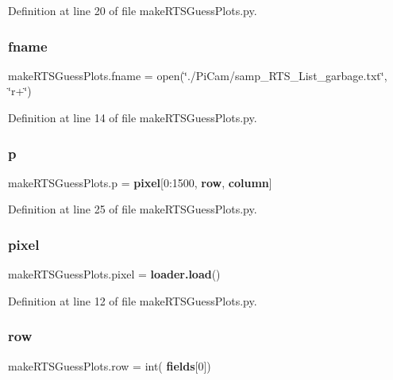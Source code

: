 Definition at line 20 of file make\+R\+T\+S\+Guess\+Plots.\+py.

\mbox{\label{namespacemake_r_t_s_guess_plots_abaa16a9153c4f7d706d33703b75417bc}} 
\subsubsection{fname}
{\footnotesize\ttfamily make\+R\+T\+S\+Guess\+Plots.\+fname = open(\char`\"{}./Pi\+Cam/samp\+\_\+\+R\+T\+S\+\_\+\+List\+\_\+garbage.\+txt\char`\"{}, \char`\"{}r+\char`\"{})}



Definition at line 14 of file make\+R\+T\+S\+Guess\+Plots.\+py.

\mbox{\label{namespacemake_r_t_s_guess_plots_a1adbf5fdd9b0a9f5b43c4cfdff0d2a32}} 
\subsubsection{p}
{\footnotesize\ttfamily make\+R\+T\+S\+Guess\+Plots.\+p = \textbf{ pixel}[0\+:1500, \textbf{ row}, \textbf{ column}]}



Definition at line 25 of file make\+R\+T\+S\+Guess\+Plots.\+py.

\mbox{\label{namespacemake_r_t_s_guess_plots_a64a9cf838956d74b6cc38ef494c0a2c5}} 
\subsubsection{pixel}
{\footnotesize\ttfamily make\+R\+T\+S\+Guess\+Plots.\+pixel = \textbf{ loader.\+load}()}



Definition at line 12 of file make\+R\+T\+S\+Guess\+Plots.\+py.

\mbox{\label{namespacemake_r_t_s_guess_plots_a3cea235bd7d4301bddd2a43c671e6598}} 
\subsubsection{row}
{\footnotesize\ttfamily make\+R\+T\+S\+Guess\+Plots.\+row = int(\textbf{ fields}[0])}



